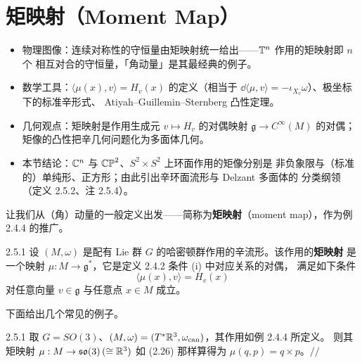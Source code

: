 \section{矩映射（Moment Map）}

\begin{keytakeaways}
\begin{itemize}
  \item 物理图像：连续对称性的守恒量由矩映射统一给出——$\mathbb{T}^n$ 作用的矩映射即 $n$ 个
        相互对合的守恒量，「角动量」是其最经典的例子。
  \item 数学工具：$\langle\mu(x),v\rangle=H_v(x)$ 的定义（相当于
        $\dd\langle\mu,v\rangle=-\iota_{X_v}\omega$）、极坐标下的标准辛形式、
        Atiyah--Guillemin--Sternberg 凸性定理。
  \item 几何观点：矩映射是作用生成元 $v\mapsto H_v$ 的对偶映射
        $\mathfrak{g}\to C^\infty(M)$ 的对偶；矩像的凸性把辛几何问题化为多面体几何。
  \item 本节结论：$\mathbb{C}^n$ 与 $\mathbb{CP}^2$、$S^2\times S^2$ 上环面作用的矩像分别是
        非负象限与（标准的）单纯形、正方形；由此引出辛环面流形与 Delzant 多面体的
        分类纲领（定义 2.5.2、注 2.5.4）。
\end{itemize}
\end{keytakeaways}

让我们从（角）动量的一般定义出发——简称为\textbf{矩映射}（moment map），作为例 2.4.4
的推广。

\begin{wdefn}{2.5.1}
设 $(M,\omega)$ 是配有 Lie 群 $G$ 的哈密顿群作用的辛流形。该作用的\textbf{矩映射}
是一个映射 $\mu:M\to\mathfrak{g}^*$，它是定义 2.4.2 条件 (i) 中对应关系的对偶，
满足如下条件
\[
  \langle\mu(x),v\rangle=H_v(x)
\]
对任意向量 $v\in\mathfrak{g}$ 与任意点 $x\in M$ 成立。
\end{wdefn}

下面给出几个常见的例子。

\begin{wexam}{2.5.1}
取 $G=SO(3)$、$(M,\omega)=(T^*\mathbb{R}^3,\omega_{\mathrm{can}})$，其作用如例 2.4.4 所定义。
则其矩映射 $\mu:M\to\mathfrak{so}(3)\,(\cong\mathbb{R}^3)$ 如 (2.26) 那样算得为
$\mu(q,p)=q\times p$。\hfill$//$
\end{wexam}

